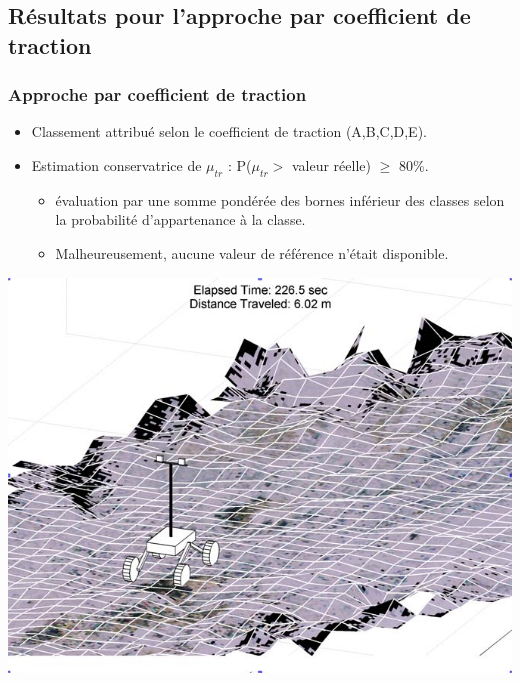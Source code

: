 \subsection{Résultats pour l'approche par coefficient de traction}
    \begin{frame}
        \frametitle{Approche par coefficient de traction}
        \begin{itemize}
            \item Classement attribué selon le coefficient de traction (A,B,C,D,E).
            \item Estimation conservatrice de $\mu_{tr}$ : P($\mu_{tr}>$ valeur réelle) $\geq$ 80\%.            
            \begin{itemize}
                 \item évaluation par une somme pondérée des bornes inférieur des classes selon la probabilité d'appartenance à la classe.
                 \item Malheureusement, aucune valeur de référence n'était disponible.
            \end{itemize}
        \end{itemize}
    \end{frame}
    
    \begin{frame}[c]
        \begin{center}
            \includegraphics[height=0.8\textheight]{./media/resultatCarte.jpg}
        \end{center}        
    \end{frame}
    
